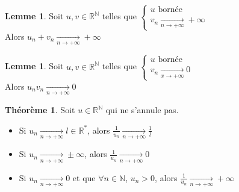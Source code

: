 \documentclass[10pt,a4paper]{article}
\theoremstyle{definition}
\newtheorem{theorem}[proposition]{Théorème}
\newtheorem{lemme}[proposition]{Lemme}
\begin{document}
\begin{lemme}
Soit $u, v \in \mathbb{R}^\mathbb{N}$ telles que $\begin{cases}
u \text{ bornée} \\ v_n \xrightarrow[n \to +\infty]{} +\infty \end{cases}$ \\
Alors $u_n + v_n \xrightarrow[n \to +\infty]{} +\infty$
\end{lemme}
\begin{lemme}
Soit $u, v \in \mathbb{R}^\mathbb{N}$ telles que $\begin{cases}
u \text{ bornée} \\ v_n \xrightarrow[x \to +\infty]{} 0 \end{cases}$ \\
Alors $u_n v_n \xrightarrow[n \to +\infty]{} 0$
\end{lemme}
\begin{theorem}
Soit $u \in \mathbb{R}^\mathbb{N}$ qui ne s'annule pas.
\begin{itemize}
\item Si $u_n \xrightarrow[n \to +\infty]{} l \in \mathbb{R}^*$, alors $\frac{1}{u_n} \xrightarrow[n \to +\infty]{} \frac{1}{l}$
\item Si $u_n \xrightarrow[n \to +\infty]{} \pm\infty$, alors $\frac{1}{u_n} \xrightarrow[n \to +\infty]{} 0$
\item Si $u_n \xrightarrow[n \to +\infty]{} 0$ et que $\forall n \in \mathbb{N}$, $u_n > 0$, alors $\frac{1}{u_n} \xrightarrow[n \to +\infty]{} +\infty$
\end{itemize}
\end{theorem}
\end{document}
